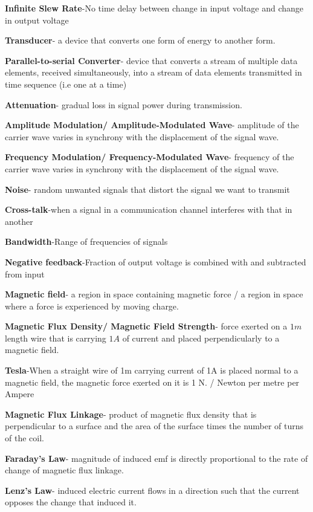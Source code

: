 \documentclass{article}
\begin{document}
\begin{flushleft}
 \textbf{Infinite Slew Rate}-No time delay between change in input voltage and change in output voltage
 
 \textbf{Transducer}- a device that converts one form of energy to another form.
 
 \textbf{Parallel-to-serial Converter}- device that converts a stream of multiple data elements, received simultaneously, into a stream of data elements transmitted in time sequence (i.e one at a time)
 
 \textbf{Attenuation}- gradual loss in signal power during transmission.
 
 \textbf{Amplitude Modulation/ Amplitude-Modulated Wave}- amplitude of the carrier wave varies in synchrony with the displacement of the signal wave.
 
  \textbf{Frequency Modulation/ Frequency-Modulated Wave}- frequency of the carrier wave varies in synchrony with the displacement of the signal wave.
  
  \textbf{Noise}- random unwanted signals that distort the signal we want to transmit
 
 \textbf{Cross-talk}-when a signal in a communication channel interferes with that in another
 
 \textbf{Bandwidth}-Range of frequencies of signals
 
 \textbf{Negative feedback}-Fraction of output voltage is combined with and subtracted from input
 
 \textbf{Magnetic field}- a region in space containing magnetic force / a region in space where a force is experienced by moving charge.
 
 \textbf{Magnetic Flux Density/ Magnetic Field Strength}- force exerted on a $1m$ length wire that is carrying $1A$ of current and placed perpendicularly to a magnetic field.
 
 \textbf{Tesla}-When a straight wire of 1m carrying current of 1A is placed normal to a magnetic field, the magnetic force exerted on it is 1 N. / Newton per metre per Ampere
 
 \textbf{Magnetic Flux Linkage}- product of magnetic flux density that is perpendicular to a surface and the area of the surface times the number of turns of the coil.
 
 \textbf{Faraday's Law}- magnitude of induced emf is directly proportional to the rate of change of magnetic flux linkage.
 
 \textbf{Lenz's Law}- induced electric current flows in a direction such that the current opposes the change that induced it.
 

\end{flushleft}
\end{document}
